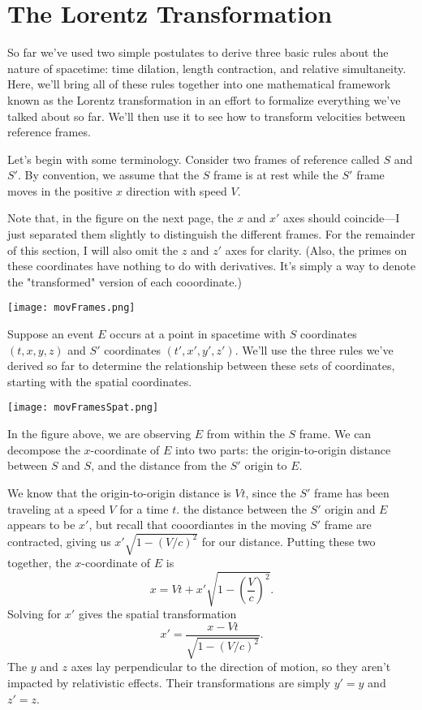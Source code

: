 \documentclass[../p023main.tex]{subfiles}
\begin{document}
\section{The Lorentz Transformation}
So far we've used two simple postulates to derive three basic rules about the nature of spacetime: time dilation, length contraction, and relative simultaneity.
Here, we'll bring all of these rules together into one mathematical framework known as the Lorentz transformation in an effort to formalize everything we've talked about so far.
We'll then use it to see how to transform velocities between reference frames.

Let's begin with some terminology.
Consider two frames of reference called $S$ and $S'$.
By convention, we assume that the $S$ frame is at rest while the $S'$ frame moves in the positive $x$ direction with speed $V$.

Note that, in the figure on the next page, the $x$ and $x'$ axes should coincide---I just separated them slightly to distinguish the different frames.
For the remainder of this section, I will also omit the $z$ and $z'$ axes for clarity.
(Also, the primes on these coordinates have nothing to do with derivatives.
It's simply a way to denote the "transformed" version of each cooordinate.)
\begin{center}
    \texttt{[image: movFrames.png]}
\end{center}
Suppose an event $E$ occurs at a point in spacetime with $S$ coordinates $(t, x, y, z)$ and $S'$ coordinates $(t', x', y', z')$.
We'll use the three rules we've derived so far to determine the relationship between these sets of coordinates, starting with the spatial coordinates.
\begin{center}
    \texttt{[image: movFramesSpat.png]}
\end{center}
In the figure above, we are observing $E$ from within the $S$ frame.
We can decompose the $x$-coordinate of $E$ into two parts: the origin-to-origin distance between $S$ and $S$, and the distance from the $S'$ origin to $E$.

We know that the origin-to-origin distance is $Vt$, since the $S'$ frame has been traveling at a speed $V$ for a time $t$.
the distance between the $S'$ origin and $E$ appears to be $x'$, but recall that cooordiantes in the moving $S'$ frame are contracted, giving us $x' \sqrt{1 - \left( V / c \right)^2}$ for our distance.
Putting these two together, the $x$-coordinate of $E$ is
\[ x = Vt + x'\sqrt{1 - \left( \frac{V}{c} \right)^2}. \]
Solving for $x'$ gives the spatial transformation
\[ x' = \frac{x - Vt}{\sqrt{1 - \left( V / c \right)^2}}. \]
The $y$ and $z$ axes lay perpendicular to the direction of motion, so they aren't impacted by relativistic effects.
Their transformations are simply $y' = y$ and $z' = z$.
\end{document}
